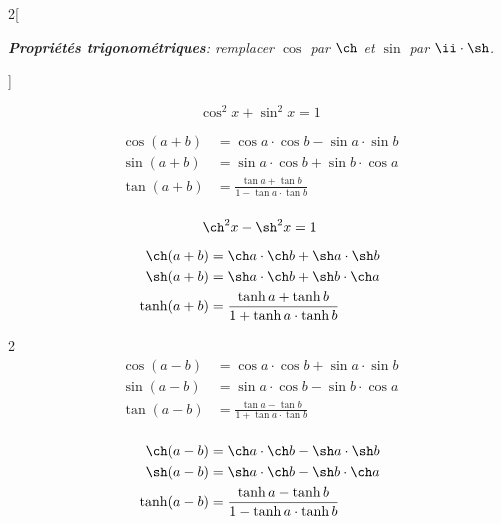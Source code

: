 \documentclass[class=report,crop=false]{standalone}
\begin{document}
\begin{multicols}{2}[
\begin{center}
\emph{\textbf{Propri\'et\'es trigonom\'etriques}: remplacer $\cos$ par $\ch$
et $\sin$ par $\ii\cdot\sh$.}
\end{center}
\vspace{0.5em}]

$$\cos^2 x + \sin^2 x = 1$$

\begin{align*}
\cos(a+b)&=\cos a\cdot\cos b - \sin a\cdot\sin b\\
\sin(a+b)&=\sin a\cdot\cos b  +  \sin b\cdot\cos a \\
\tan (a+b)&=\frac{\tan a + \tan b}{1-\tan a\cdot\tan b} \\
\end{align*}


$$\ch^2 x - \sh^2 x = 1$$

\begin{align*}
\ch(a+b)&=\ch a\cdot\ch b + \sh a\cdot\sh b\\
\sh(a+b)&=\sh a\cdot\ch b  +  \sh b\cdot\ch a\\
\tanh (a+b)&=\frac{\tanh a + \tanh b}{1+\tanh a\cdot\tanh b}\\
\end{align*}
\end{multicols}



\begin{multicols}{2}
\begin{align*}
\cos(a-b)&=\cos a\cdot\cos b + \sin a\cdot\sin b\\
\sin(a-b)&=\sin a\cdot\cos b  - \sin b\cdot\cos a \\
\tan (a-b)&=\frac{\tan a - \tan b}{1+\tan a\cdot\tan b} \\
\end{align*}

\begin{align*}
\ch(a-b)&=\ch a\cdot\ch b - \sh a\cdot\sh b\\
\sh(a-b)&=\sh a\cdot\ch b  - \sh b\cdot\ch a\\
\tanh (a-b)&=\frac{\tanh a - \tanh b}{1-\tanh a\cdot\tanh b}\\
\end{align*}

\end{multicols}
\end{document}
